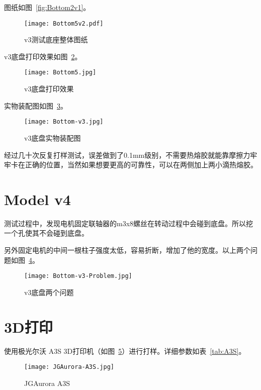 图纸如图~\ref{fig:Bottom2v1}。

\begin{figure}[htbp]
    \centering
    \texttt{[image: Bottom5v2.pdf]}
    \caption{v3测试底座整体图纸}
    \label{fig:Bottom5v2}
\end{figure}

v3底盘打印效果如图~\ref{fig:Bottom5}。

\begin{figure}[htbp]
    \centering
    \texttt{[image: Bottom5.jpg]}
    \caption{v3底盘打印效果}
    \label{fig:Bottom5}
\end{figure}

实物装配图如图~\ref{fig:Bottom-v3}。

\begin{figure}[htbp]
    \centering
    \texttt{[image: Bottom-v3.jpg]}
    \caption{v3底盘实物装配图}
    \label{fig:Bottom-v3}
\end{figure}

经过几十次反复打样测试，误差做到了0.1mm级别，不需要热熔胶就能靠摩擦力牢牢卡在正确的位置，当然如果想要更高的可靠性，可以在两侧加上两小滴热熔胶。

\section{Model v4}

测试过程中，发现电机固定联轴器的m3x8螺丝在转动过程中会碰到底盘。所以挖一个孔使其不会碰到底盘。

另外固定电机的中间一根柱子强度太低，容易折断，增加了他的宽度。以上两个问题如图~\ref{fig:Bottom-v3-Problem}。

\begin{figure}[htbp]
    \centering
    \texttt{[image: Bottom-v3-Problem.jpg]}
    \caption{v3底盘两个问题}
    \label{fig:Bottom-v3-Problem}
\end{figure}

\section{3D打印}

使用极光尔沃 A3S 3D打印机（如图~\ref{fig:A3S}）进行打样。详细参数如表~\ref{tab:A3S}。

\begin{figure}[htbp]
    \centering
    \texttt{[image: JGAurora-A3S.jpg]}
    \caption{JGAurora A3S}
    \label{fig:A3S}
\end{figure}

